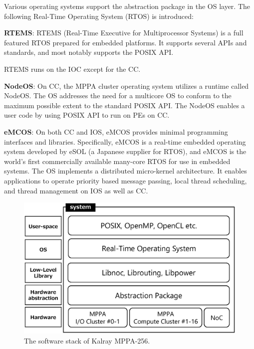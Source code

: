 \documentclass[conference,compsoc]{IEEEtran}
\newcommand{\comment}[1]{}
\begin{document}
Various operating systems support the abstraction package in the OS layer.
The following Real-Time Operating System (RTOS) is introduced:

\textbf{RTEMS}: RTEMS (Real-Time Executive for Multiprocessor Systems) is a full featured RTOS prepared for embedded platforms.
It supports several APIs and standards, and most notably supports the POSIX API.
\comment{1-18}
RTEMS runs on the IOC except for the CC.

\textbf{NodeOS}: On CC, the MPPA cluster operating system utilizes a runtime called NodeOS.
The OS addresses the need for a multicore OS to conform to the maximum possible extent to the standard POSIX API.
The NodeOS enables a user code by using POSIX API to run on PEs on CC.

\textbf{eMCOS}: On both CC and IOS, eMCOS provides minimal programming interfaces and libraries.
Specifically, eMCOS is a real-time embedded operating system developed by eSOL (a Japanese supplier for RTOS), and eMCOS is the world's first commercially available many-core RTOS for use in embedded systems.
The OS implements a distributed micro-kernel architecture.
It enables applications to operate priority based message passing, local thread scheduling, and thread management on IOS as well as CC.

\begin{figure}[t]
  \centering
  \includegraphics[width=0.8\linewidth]{../figure/softwarestack.eps}
  \vspace{-3mm}
  \caption{\label{fig:software_stack}
    The software stack of Kalray MPPA-256.}
  \vspace{-5mm}
\end{figure}
\end{document}
